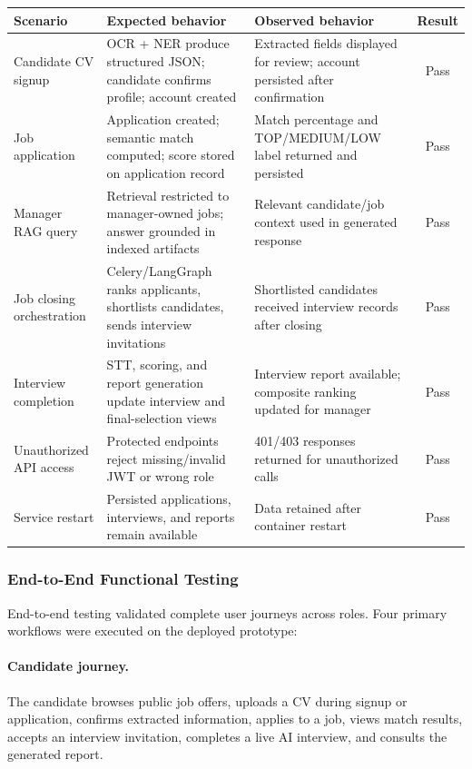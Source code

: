 \begin{center}
\label{tab:integration_tests}
\renewcommand{\arraystretch}{1.15}
\begin{tabularx}{\textwidth}{|p{3.2cm}|X|X|c|}
\hline
\rowcolor{gray!20} \textbf{Scenario} & \textbf{Expected behavior} & \textbf{Observed behavior} & \textbf{Result} \\
\hline
Candidate CV signup &
OCR + NER produce structured JSON; candidate confirms profile; account created &
Extracted fields displayed for review; account persisted after confirmation &
Pass \\
\hline
Job application &
Application created; semantic match computed; score stored on application record &
Match percentage and TOP/MEDIUM/LOW label returned and persisted &
Pass \\
\hline
Manager RAG query &
Retrieval restricted to manager-owned jobs; answer grounded in indexed artifacts &
Relevant candidate/job context used in generated response &
Pass \\
\hline
Job closing orchestration &
Celery/LangGraph ranks applicants, shortlists candidates, sends interview invitations &
Shortlisted candidates received interview records after closing &
Pass \\
\hline
Interview completion &
STT, scoring, and report generation update interview and final-selection views &
Interview report available; composite ranking updated for manager &
Pass \\
\hline
Unauthorized API access &
Protected endpoints reject missing/invalid JWT or wrong role &
401/403 responses returned for unauthorized calls &
Pass \\
\hline
Service restart &
Persisted applications, interviews, and reports remain available &
Data retained after container restart &
Pass \\
\hline
\end{tabularx}
\end{center}

\subsubsection{End-to-End Functional Testing}
\label{sec:ch5:e2e_tests}

End-to-end testing validated complete user journeys across roles. Four primary workflows were executed on the deployed prototype:

\paragraph{Candidate journey.}
The candidate browses public job offers, uploads a CV during signup or application, confirms extracted information, applies to a job, views match results, accepts an interview invitation, completes a live AI interview, and consults the generated report.


